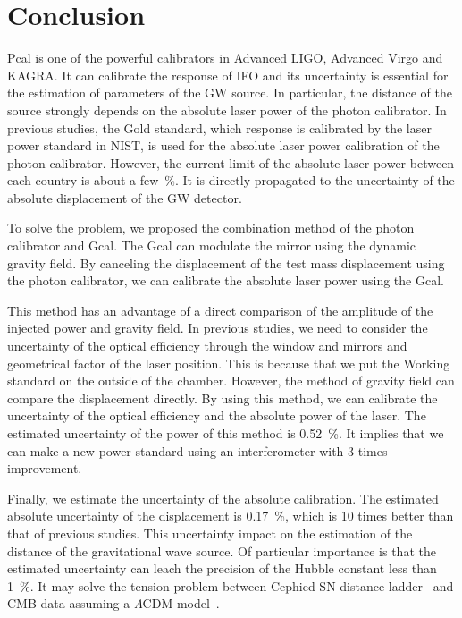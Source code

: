 \documentclass[%
 reprint,
superscriptaddress,
 amsmath,amssymb,
 aps,
]{revtex4-1}
\begin{document}
\section{Conclusion}
Pcal is one of the powerful calibrators in Advanced LIGO, Advanced Virgo and KAGRA. It can calibrate the response of IFO and its uncertainty is essential for the estimation of parameters of the GW source. In particular, the distance of the source strongly depends on the absolute laser power of the photon calibrator. In previous studies, the Gold standard, which response is calibrated by the laser power standard in NIST, is used for the absolute laser power calibration of the photon calibrator. However, the current limit of the absolute laser power between each country is about a few~\%. It is directly propagated to the uncertainty of the absolute displacement of the GW detector.

To solve the problem, we proposed the combination method of the photon calibrator and Gcal. The Gcal can modulate the mirror using the dynamic gravity field. By canceling the displacement of the test mass displacement using the photon calibrator, we can calibrate the absolute laser power using the Gcal.

This method has an advantage of a direct comparison of the amplitude of the injected power and gravity field. In previous studies, we need to consider the uncertainty of the optical efficiency through the window and mirrors  and geometrical factor of the laser position. This is because that we put the Working standard on the outside of the chamber. However, the method of gravity field can compare the displacement directly. By using this method, we can calibrate the uncertainty of the optical efficiency and the absolute power of the laser.  The estimated uncertainty of the power of this method is 0.52~\%. It implies that we can make a new power standard using an interferometer with 3 times improvement.

Finally, we estimate the uncertainty of the absolute calibration. The estimated absolute uncertainty of the displacement is 0.17~\%, which is 10 times better than that of previous studies. This uncertainty impact on the estimation of the distance of the gravitational wave source. Of particular importance is that the estimated uncertainty can leach the precision of the Hubble constant less than 1~\%. It may solve the tension problem between Cephied-SN distance ladder~\cite{Riess_2016} and CMB data assuming a $\Lambda$CDM 
model~\cite{2016-planck}.
\end{document}
